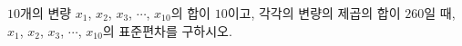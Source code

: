 $10$개의 변량 $x_1$, $x_2$, $x_3$, $\cdots$, $x_{10}$의 합이 $10$이고, 각각의 변량의 제곱의 합이 $260$일 때, $x_1$, $x_2$, $x_3$, $\cdots$, $x_{10}$의 표준편차를 구하시오.
